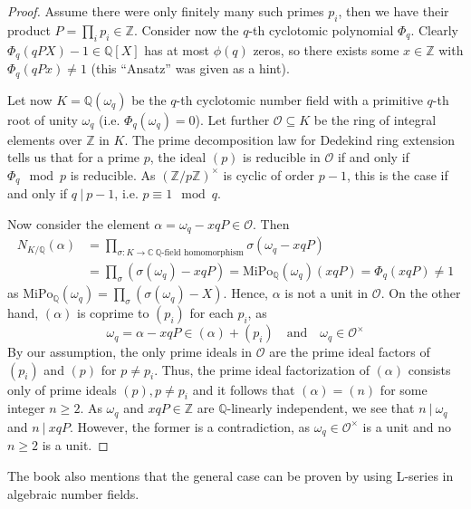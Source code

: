 \documentclass{scrartcl}
\newcommand{\Z}{\mathbb{Z}}
\newcommand{\Q}{\mathbb{Q}}
\newcommand{\C}{\mathbb{C}}
\newcommand{\divides}{\ | \ }
\newcommand{\units}{\times}
\theoremstyle{definition}
\begin{document}
\begin{proof}
    Assume there were only finitely many such primes $p_i$, then we have their product $P = \prod_i p_i \in \Z$.
    Consider now the $q$-th cyclotomic polynomial $\Phi_q$.
    Clearly $\Phi_q(qPX) - 1 \in \Q[X]$ has at most $\phi(q)$ zeros, so there exists some $x \in \Z$ with $\Phi_q(qPx) \neq 1$ (this ``Ansatz'' was given as a hint).

    Let now $K = \Q(\omega_q)$ be the $q$-th cyclotomic number field with a primitive $q$-th root of unity $\omega_q$ (i.e. $\Phi_q(\omega_q) = 0$).
    Let further $\mathcal{O} \subseteq K$ be the ring of integral elements over $\Z$ in $K$.
    The prime decomposition law for Dedekind ring extension \cite[Chapter I, Prop 8.3]{neukirch} tells us that for a prime $p$, the ideal $(p)$ is reducible in $\mathcal{O}$ if and only if $\Phi_q \mod p$ is reducible.
    As $(\Z/p\Z)^\units$ is cyclic of order $p - 1$, this is the case if and only if $q \divides p - 1$, i.e. $p \equiv 1 \mod q$.

    Now consider the element $\alpha = \omega_q - xqP \in \mathcal{O}$. Then
    \begin{align*}
        N_{K/\Q}(\alpha) &= \prod_{\sigma: K \to \C \ \text{$\Q$-field homomorphism}} \sigma(\omega_q - xqP) \\
        &= \prod_{\sigma} (\sigma(\omega_q) - xqP) = \mathrm{MiPo}_\Q(\omega_q)(xqP) = \Phi_q(xqP) \neq 1
    \end{align*}
    as $\mathrm{MiPo}_\Q(\omega_q) = \prod_\sigma (\sigma(\omega_q) - X)$.
    Hence, $\alpha$ is not a unit in $\mathcal{O}$.
    On the other hand, $(\alpha)$ is coprime to $(p_i)$ for each $p_i$, as 
    \begin{equation*}
        \omega_q = \alpha - xqP \in (\alpha) + (p_i) \quad \text{and} \quad \omega_q \in \mathcal{O}^\units
    \end{equation*}
    By our assumption, the only prime ideals in $\mathcal{O}$ are the prime ideal factors of $(p_i)$ and $(p)$ for $p \neq p_i$.
    Thus, the prime ideal factorization of $(\alpha)$ consists only of prime ideals $(p), p \neq p_i$ and it follows that $(\alpha) = (n)$ for some integer $n \geq 2$.
    As $\omega_q$ and $xqP \in \Z$ are $\Q$-linearly independent, we see that $n \divides \omega_q$ and $n \divides xqP$.
    However, the former is a contradiction, as $\omega_q \in \mathcal{O}^\units$ is a unit and no $n \geq 2$ is a unit.
\end{proof}
The book also mentions that the general case can be proven by using L-series in algebraic number fields.
\end{document}
